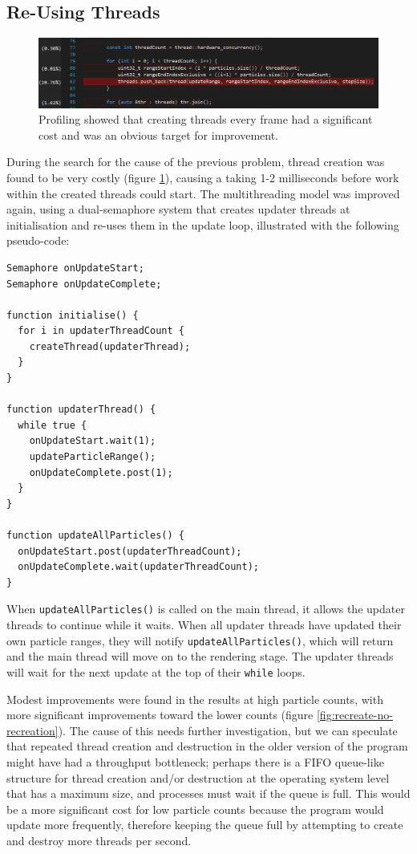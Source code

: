 \documentclass[11pt, a4paper, twocolumn]{article}
\begin{document}
\subsection{Re-Using Threads}

\begin{figure}[h]
\includegraphics[width=\linewidth]{thread-create}
\caption{Profiling showed that creating threads every frame had a significant cost and was an obvious target for improvement.}
\label{fig:thread-create}
\end{figure}

During the search for the cause of the previous problem, thread creation was found to be very costly (figure \ref{fig:thread-create}), causing a taking 1-2 milliseconds before work within the created threads could start. The multithreading model was improved again, using a dual-semaphore system that creates updater threads at initialisation and re-uses them in the update loop, illustrated with the following pseudo-code:

\begin{verbatim}
Semaphore onUpdateStart;
Semaphore onUpdateComplete;

function initialise() {
  for i in updaterThreadCount {
    createThread(updaterThread);
  }
}

function updaterThread() {
  while true {
    onUpdateStart.wait(1);
    updateParticleRange();
    onUpdateComplete.post(1);
  }
}

function updateAllParticles() {
  onUpdateStart.post(updaterThreadCount);
  onUpdateComplete.wait(updaterThreadCount);
}
\end{verbatim}

When \verb|updateAllParticles()| is called on the main thread, it allows the updater threads to continue while it waits. When all updater threads have updated their own particle ranges, they will notify \verb|updateAllParticles()|, which will return and the main thread will move on to the rendering stage. The updater threads will wait for the next update at the top of their \verb|while| loops.

Modest improvements were found in the results at high particle counts, with more significant improvements toward the lower counts (figure \ref{fig:recreate-no-recreation}). The cause of this needs further investigation, but we can speculate that repeated thread creation and destruction in the older version of the program might have had a throughput bottleneck; perhaps there is a FIFO queue-like structure for thread creation and/or destruction at the operating system level that has a maximum size, and processes must wait if the queue is full. This would be a more significant cost for low particle counts because the program would update more frequently, therefore keeping the queue full by attempting to create and destroy more threads per second.
\end{document}
